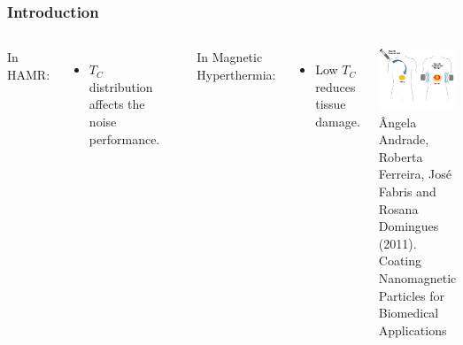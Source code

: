 \documentclass{beamer}
\begin{document}
\begin{frame}
	\frametitle{Introduction}
	\begin{columns}
		\column{6cm}
		In HAMR\footnotemark[1]:
		\begin{itemize}
			\item{$T_C$ distribution affects the noise performance.}
		\end{itemize} \vspace{4mm}
		
		\begin{center}
		\includegraphics[width=4cm]{Images/Ds_noinset} \\ \vspace{3mm}
		\end{center}
		
		\column{6cm}
		In Magnetic Hyperthermia\footnotemark[2]:
		\begin{itemize}
		\item{Low $T_C$ reduces tissue damage.}
		\end{itemize} \vspace{1mm}
		
		\begin{center}
		\includegraphics[width=4cm]{Images/person} \\
		\tiny \^{A}ngela Andrade, Roberta Ferreira, Jos\'{e} Fabris and Rosana Domingues (2011). Coating Nanomagnetic Particles for Biomedical Applications
		\end{center}
	\end{columns}
\end{frame}
\end{document}
